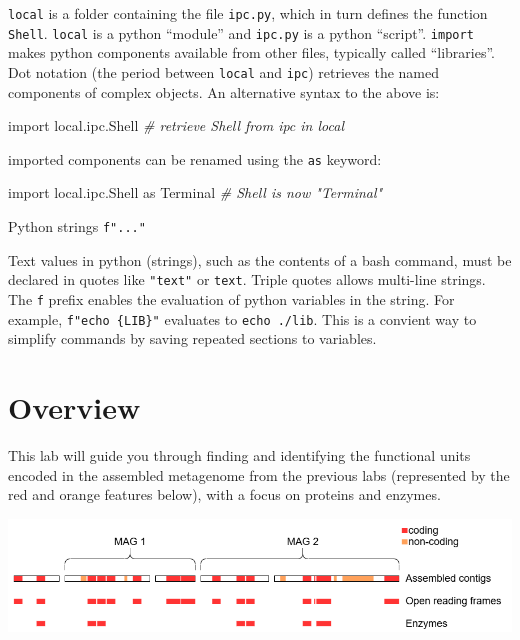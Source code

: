 \documentclass[
]{book}
\newenvironment{Shaded}{\begin{snugshade}}{\end{snugshade}}
\newcommand{\CommentTok}[1]{\textcolor[rgb]{0.56,0.35,0.01}{\textit{#1}}}
\newcommand{\ImportTok}[1]{#1}
\newcommand{\NormalTok}[1]{#1}
\begin{document}
\texttt{local} is a folder containing the file \texttt{ipc.py}, which in turn defines the function \texttt{Shell}.
\texttt{local} is a python ``module'' and \texttt{ipc.py} is a python ``script''.
\texttt{import} makes python components available from other files, typically called ``libraries''.
Dot notation (the period between \texttt{local} and \texttt{ipc}) retrieves the named components of complex objects.
An alternative syntax to the above is:

\begin{Shaded}
\begin{Highlighting}[numbers=left,,]
\ImportTok{import}\NormalTok{ local.ipc.Shell }\CommentTok{\# retrieve Shell from ipc in local}
\end{Highlighting}
\end{Shaded}

imported components can be renamed using the \texttt{as} keyword:

\begin{Shaded}
\begin{Highlighting}[numbers=left,,]
\ImportTok{import}\NormalTok{ local.ipc.Shell }\ImportTok{as}\NormalTok{ Terminal }\CommentTok{\# Shell is now "Terminal"}
\end{Highlighting}
\end{Shaded}

Python strings \texttt{f"..."}

Text values in python (strings), such as the contents of a bash command, must be declared in quotes like \texttt{"text"} or \texttt{\textquotesingle{}text\textquotesingle{}}.
Triple quotes allows multi-line strings. The \texttt{f} prefix enables the evaluation of python variables in the string.
For example, \texttt{f"echo\ \{LIB\}"} evaluates to \texttt{echo\ ./lib}.
This is a convient way to simplify commands by saving repeated sections to variables.

\section{Overview}\label{overview-1}

This lab will guide you through finding and identifying the functional units encoded in the assembled metagenome from the previous labs
(represented by the red and orange features below), with a focus on proteins and enzymes.

\includegraphics{img/lab3/data_layout.png}
\end{document}
